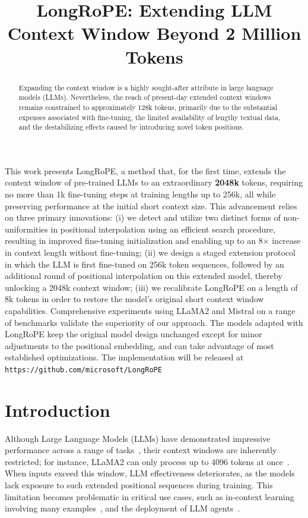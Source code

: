 \title{LongRoPE: Extending LLM Context Window Beyond 2 Million Tokens}

\begin{abstract}
Expanding the context window is a highly sought-after attribute in large language models (LLMs). Nevertheless, the reach of present-day extended context windows remains constrained to approximately 128k tokens, primarily due to the substantial expenses associated with fine-tuning, the limited availability of lengthy textual data, and the destabilizing effects caused by introducing novel token positions.
\end{abstract}

This work presents LongRoPE, a method that, for the first time, extends the context window of pre-trained LLMs to an extraordinary \textbf{2048k} tokens, requiring no more than 1k fine-tuning steps at training lengths up to 256k, all while preserving performance at the initial short context size. This advancement relies on three primary innovations: (i) we detect and utilize two distinct forms of non-uniformities in positional interpolation using an efficient search procedure, resulting in improved fine-tuning initialization and enabling up to an 8$\times$ increase in context length without fine-tuning; (ii) we design a staged extension protocol in which the LLM is first fine-tuned on 256k token sequences, followed by an additional round of positional interpolation on this extended model, thereby unlocking a 2048k context window; (iii) we recalibrate LongRoPE on a length of 8k tokens in order to restore the model’s original short context window capabilities. Comprehensive experiments using LLaMA2 and Mistral on a range of benchmarks validate the superiority of our approach. The models adapted with LongRoPE keep the original model design unchanged except for minor adjustments to the positional embedding, and can take advantage of most established optimizations. The implementation will be released at \texttt{https://github.com/microsoft/LongRoPE}

\section{Introduction}

Although Large Language Models (LLMs) have demonstrated impressive performance across a range of tasks~\cite{gpt4,llama2}, their context windows are inherently restricted; for instance, LLaMA2 can only process up to 4096 tokens at once~\cite{llama2}. When inputs exceed this window, LLM effectiveness deteriorates, as the models lack exposure to such extended positional sequences during training. This limitation becomes problematic in critical use cases, such as in-context learning involving many examples~\cite{Huang2023FewerIM}, and the deployment of LLM agents~\cite{park2023generative,madaan2023selfrefine}.

